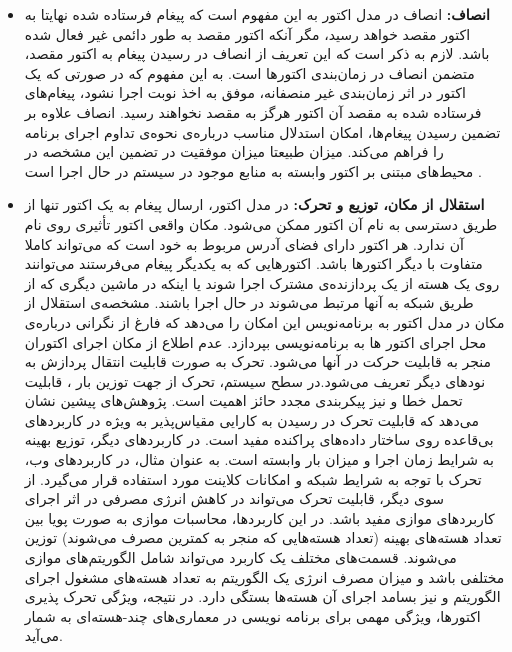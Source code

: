\begin{itemize}
\item \textbf{ \gls{انصاف}:}
انصاف در مدل اکتور به این مفهوم است که پیغام فرستاده شده نهایتا به اکتور مقصد خواهد رسید، مگر آنکه اکتور مقصد به طور دائمی غیر فعال شده باشد. لازم به ذکر است که این تعریف از  انصاف در رسیدن پیغام به اکتور مقصد، متضمن انصاف در \gls{زمان‌بندی} اکتور‌ها است. به این مفهوم که در صورتی که یک اکتور در اثر  زمان‌بندی غیر منصفانه، موفق به اخذ نوبت اجرا نشود، پیغام‌های فرستاده شده به مقصد آن اکتور هرگز به مقصد نخواهند رسید. انصاف علاوه بر تضمین رسیدن پیغام‌ها، امکان استدلال مناسب درباره‌ی نحوه‌ی تداوم اجرای  برنامه‌ را فراهم می‌کند. میزان طبیعتا میزان موفقیت در تضمین این مشخصه در محیط‌های مبتنی بر اکتور وابسته به منابع موجود در سیستم در حال اجرا است \cite{ActorsJVM2009}.
\item \textbf{ استقلال از مکان، توزیع و تحرک:}
\label{mobility}
در مدل اکتور، ارسال پیغام به یک اکتور تنها از طریق دسترسی به نام آن اکتور ممکن می‌شود. مکان واقعی اکتور تأثیری روی نام آن ندارد. هر اکتور دارای فضای آدرس مربوط به خود است که می‌تواند کاملا متفاوت با دیگر اکتور‌ها باشد. اکتورهایی که به یکدیگر پیغام می‌فرستند می‌توانند روی یک هسته از یک پردازنده‌ی مشترک اجرا شوند یا اینکه در ماشین دیگری که از طریق شبکه به آنها مرتبط می‌شوند در حال اجرا باشند. مشخصه‌ی  استقلال از مکان در مدل اکتور به برنامه‌نویس این امکان را می‌دهد که فارغ از نگرانی درباره‌ی محل اجرای  اکتور ها به برنامه‌نویسی بپردازد.
 عدم اطلاع از مکان اجرای اکتوران  منجر به قابلیت حرکت در آنها می‌شود. تحرک به صورت قابلیت انتقال پردازش به نودهای دیگر تعریف می‌شود.در سطح سیستم، تحرک از جهت توزین بار ، قابلیت تحمل خطا و نیز پیکربندی مجدد حائز 
 اهمیت است.
 پژوهش‌های پیشین نشان می‌دهد که قابلیت تحرک در رسیدن به کارایی \gls{مقیاس‌پذیر} به ویژه در کاربردهای  \gls{بی‌قاعده} روی ساختار داده‌های \gls{پراکنده} مفید است\cite{KimA95}. در کاربردهای دیگر، توزیع بهینه به شرایط زمان اجرا و میزان بار وابسته است. به عنوان مثال، در کاربردهای وب، تحرک با توجه به شرایط شبکه و امکانات کلاینت مورد استفاده قرار می‌گیرد\cite{ContextAwareWeb}.  
از سوی دیگر، قابلیت تحرک می‌تواند در کاهش انرژی مصرفی در اثر اجرای کاربردهای موازی مفید باشد. در این کاربردها، محاسبات موازی به صورت پویا بین تعداد هسته‌های بهینه (تعداد هسته‌هایی که منجر به کمترین مصرف می‌شوند) توزین می‌شوند. قسمت‌های مختلف یک کاربرد می‌تواند شامل الگوریتم‌های موازی مختلفی باشد و میزان مصرف انرژی یک الگوریتم به تعداد هسته‌های مشغول اجرای الگوریتم و نیز بسامد اجرای آن هسته‌ها بستگی دارد\cite{KorthikantiA10}. در نتیجه، ویژگی تحرک پذیری اکتور‌ها، ویژگی مهمی برای برنامه نویسی در معماری‌های چند-هسته‌ای به شمار می‌آید.

\end{itemize} 


